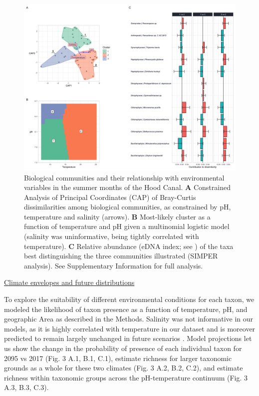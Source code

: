 \documentclass[11pt]{article}
\begin{document}
\begin{linenumbers}
\begin{figure}%
\centering
\includegraphics[width=1\linewidth]{	Figures_for_MS/Fig2}
\caption{\footnotesize{Biological communities and their relationship with environmental variables in the summer months of the Hood Canal. \textbf{A} Constrained Analysis of Principal Coordinates (CAP) of Bray-Curtis dissimilarities among biological communities, as constrained by pH, temperature and salinity (arrows). \textbf{B} Most-likely cluster as a function of temperature and pH given a multinomial logistic model (salinity was uninformative, being tightly correlated with temperature). \textbf{C} Relative abundance (eDNA index; see \cite{kelly2019understanding}) of the taxa best distinguishing the three communities illustrated (SIMPER analysis). See Supplementary Information for full analysis.}}
\label{fig:Fig2}
\end{figure}




\noindent\underline{Climate envelopes and future distributions}

To explore the suitability of different environmental conditions for each taxon, we modeled the likelihood of taxon presence as a function of temperature, pH, and geographic Area as described in the Methods. Salinity was not informative in our models, as it is highly correlated with temperature in our dataset and is moreover predicted to remain largely unchanged in future scenarios \cite{khangaonkar2019salish}. Model projections let us show the change in the probability of presence of each individual taxon for 2095 vs 2017 (Fig. 3 A.1, B.1, C.1), estimate richness for larger taxonomic grounds as a whole for these two climates (Fig. 3 A.2, B.2, C.2), and estimate richness within taxonomic groups across the pH-temperature continuum (Fig. 3 A.3, B.3, C.3). 


\end{linenumbers}
\end{document}
